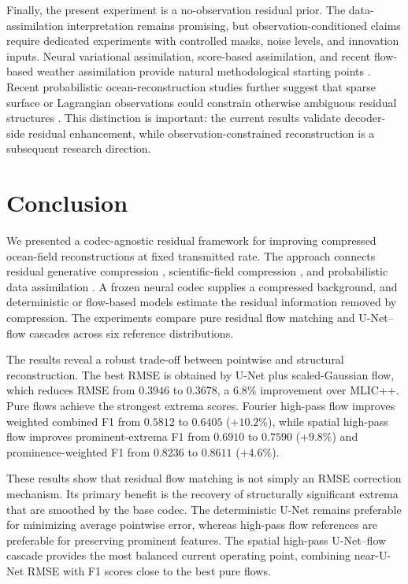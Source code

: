 \documentclass[11pt]{article}
\begin{document}
Finally, the present experiment is a no-observation residual prior. The data-assimilation interpretation remains promising, but observation-conditioned claims require dedicated experiments with controlled masks, noise levels, and innovation inputs. Neural variational assimilation, score-based assimilation, and recent flow-based weather assimilation provide natural methodological starting points \cite{fablet2021learning,rozet2023score,cheng2026flowda}. Recent probabilistic ocean-reconstruction studies further suggest that sparse surface or Lagrangian observations could constrain otherwise ambiguous residual structures \cite{asefi2025generative,asefi2026high,souza2025surface}. This distinction is important: the current results validate decoder-side residual enhancement, while observation-constrained reconstruction is a subsequent research direction.

\section{Conclusion}

We presented a codec-agnostic residual framework for improving compressed ocean-field reconstructions at fixed transmitted rate. The approach connects residual generative compression \cite{ghouse2023residual,ke2025ultra,huang2026flowcodec}, scientific-field compression \cite{mirowski2024neural,zhu2026residual}, and probabilistic data assimilation \cite{rozet2023score,cheng2026flowda}. A frozen neural codec supplies a compressed background, and deterministic or flow-based models estimate the residual information removed by compression. The experiments compare pure residual flow matching and U-Net--flow cascades across six reference distributions.

The results reveal a robust trade-off between pointwise and structural reconstruction. The best RMSE is obtained by U-Net plus scaled-Gaussian flow, which reduces RMSE from $0.3946$ to $0.3678$, a $6.8\%$ improvement over MLIC++. Pure flows achieve the strongest extrema scores. Fourier high-pass flow improves weighted combined F1 from $0.5812$ to $0.6405$ ($+10.2\%$), while spatial high-pass flow improves prominent-extrema F1 from $0.6910$ to $0.7590$ ($+9.8\%$) and prominence-weighted F1 from $0.8236$ to $0.8611$ ($+4.6\%$).

These results show that residual flow matching is not simply an RMSE correction mechanism. Its primary benefit is the recovery of structurally significant extrema that are smoothed by the base codec. The deterministic U-Net remains preferable for minimizing average pointwise error, whereas high-pass flow references are preferable for preserving prominent features. The spatial high-pass U-Net--flow cascade provides the most balanced current operating point, combining near-U-Net RMSE with F1 scores close to the best pure flows.
\end{document}
